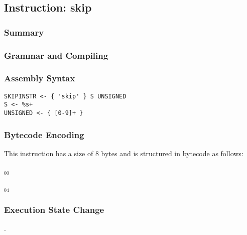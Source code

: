 \subsection{Instruction: skip}

\subsubsection{Summary}


\subsubsection{Grammar and Compiling}


\subsubsection{Assembly Syntax}

\begin{myquote}
\begin{verbatim}
SKIPINSTR <- { 'skip' } S UNSIGNED
S <- %s+
UNSIGNED <- { [0-9]+ }
\end{verbatim}
\end{myquote}


\subsubsection{Bytecode Encoding}

This instruction has a size of 8 bytes and is structured in bytecode as follows:

$_{00}$\ 



$_{04}$\ 


\subsubsection{Execution State Change}

.


